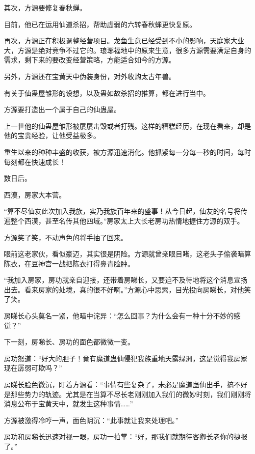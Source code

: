 \begin{this_body}
其次，方源要修复春秋蝉。

目前，他已在运用仙道杀招，帮助虚弱的六转春秋蝉更快复原。

再次，方源正在积极调整经营项目。龙鱼生意已经受到不小的影响，天庭家大业大，方源是绝对竞争不过它的。琅琊福地中的原来生意，很多方源需要满足自身的需求，剩下来的要改变经营策略，方能适合如今的方源。

另外，方源还在宝黄天中伪装身份，对外收购太古年兽。

有关于仙蛊屋雏形的设想，以及蛊如故杀招的推算，都在进行当中。

方源要打造出一个属于自己的仙蛊屋。

上一世他的仙蛊屋雏形被屡屡击毁或者打残。这样的糟糕经历，在现在看来，却是他的宝贵经验，让他受益极多。

重生以来的种种丰盛的收获，被方源迅速消化。他抓紧每一分每一秒的时间，每时每刻都在快速成长！

数日后。

西漠，房家大本营。

“算不尽仙友此次加入我族，实乃我族百年来的盛事！从今日起，仙友的名号将传遍整个西漠，甚至名传其他四域。”房家太上大长老房功热情地握住方源的双手。

方源笑了笑，不动声色的将手抽了回来。

眼前这老家伙，看似豪迈，其实很是阴险。方源就曾亲眼目睹，这老头子偷袭暗算陈衣，在豆神宫一战把陈衣打得鼻青脸肿。

“我加入房家，房功就亲自迎接，还带着房睇长，又要迫不及待地将这个消息宣扬出去。看来房家的处境，真的很不好啊。”方源心中思索，目光投向房睇长，对他笑了笑。

房睇长心头莫名一紧，他暗中诧异：“怎么回事？为什么会有一种十分不妙的感觉？”

下一刻，房睇长、房功的面色都微微一变。

房功怒道：“好大的胆子！竟有魔道蛊仙侵犯我族重地天露绿洲，这是觉得我房家现在孱弱可欺吗？”

房睇长脸色微沉，盯着方源看：“事情有些复杂了，未必是魔道蛊仙出手，搞不好是那些势力的轨迹。尤其是在当算不尽长老刚刚加入我们的微妙时刻，我们刚刚将消息公布于宝黄天中，就发生这种事情……”

方源被激得冷哼一声，面色阴沉：“此事就让我来处理吧。”

房功和房睇长迅速对视一眼，房功一拍掌：“好，那我们就期待客卿长老你的捷报了。”

\end{this_body}

